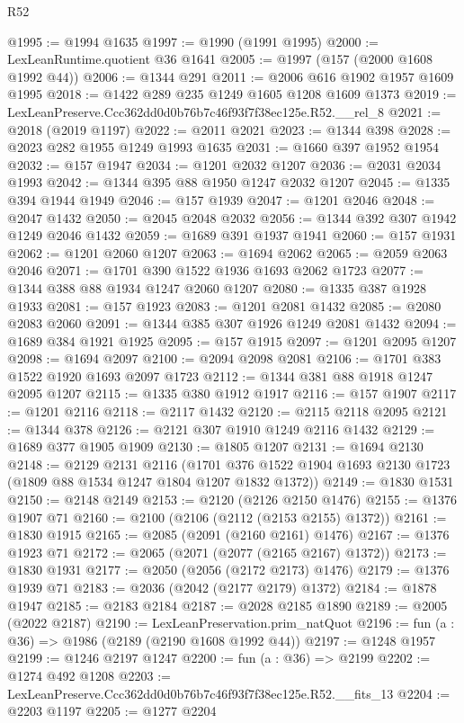 \begin{lexlean}{R52}
\begin{coremodule}
@1995 := @1994 @1635
@1997 := @1990 (@1991 @1995)
@2000 := LexLeanRuntime.quotient @36 @1641
@2005 := @1997 (@157 (@2000 @1608 @1992 @44))
@2006 := @1344 @291
@2011 := @2006 @616 @1902 @1957 @1609 @1995
@2018 := @1422 @289 @235 @1249 @1605 @1208 @1609 @1373
@2019 := LexLeanPreserve.Ccc362dd0d0b76b7c46f93f7f38ec125e.R52.__rel_8
@2021 := @2018 (@2019 @1197)
@2022 := @2011 @2021
@2023 := @1344 @398
@2028 := @2023 @282 @1955 @1249 @1993 @1635
@2031 := @1660 @397 @1952 @1954
@2032 := @157 @1947
@2034 := @1201 @2032 @1207
@2036 := @2031 @2034 @1993
@2042 := @1344 @395 @88 @1950 @1247 @2032 @1207
@2045 := @1335 @394 @1944 @1949
@2046 := @157 @1939
@2047 := @1201 @2046
@2048 := @2047 @1432
@2050 := @2045 @2048 @2032
@2056 := @1344 @392 @307 @1942 @1249 @2046 @1432
@2059 := @1689 @391 @1937 @1941
@2060 := @157 @1931
@2062 := @1201 @2060 @1207
@2063 := @1694 @2062
@2065 := @2059 @2063 @2046
@2071 := @1701 @390 @1522 @1936 @1693 @2062 @1723
@2077 := @1344 @388 @88 @1934 @1247 @2060 @1207
@2080 := @1335 @387 @1928 @1933
@2081 := @157 @1923
@2083 := @1201 @2081 @1432
@2085 := @2080 @2083 @2060
@2091 := @1344 @385 @307 @1926 @1249 @2081 @1432
@2094 := @1689 @384 @1921 @1925
@2095 := @157 @1915
@2097 := @1201 @2095 @1207
@2098 := @1694 @2097
@2100 := @2094 @2098 @2081
@2106 := @1701 @383 @1522 @1920 @1693 @2097 @1723
@2112 := @1344 @381 @88 @1918 @1247 @2095 @1207
@2115 := @1335 @380 @1912 @1917
@2116 := @157 @1907
@2117 := @1201 @2116
@2118 := @2117 @1432
@2120 := @2115 @2118 @2095
@2121 := @1344 @378
@2126 := @2121 @307 @1910 @1249 @2116 @1432
@2129 := @1689 @377 @1905 @1909
@2130 := @1805 @1207
@2131 := @1694 @2130
@2148 := @2129
    @2131
    @2116
    (@1701 @376 @1522 @1904 @1693 @2130 @1723 (@1809 @88 @1534 @1247 @1804 @1207 @1832 @1372))
@2149 := @1830 @1531
@2150 := @2148 @2149
@2153 := @2120 (@2126 @2150 @1476)
@2155 := @1376 @1907 @71
@2160 := @2100 (@2106 (@2112 (@2153 @2155) @1372))
@2161 := @1830 @1915
@2165 := @2085 (@2091 (@2160 @2161) @1476)
@2167 := @1376 @1923 @71
@2172 := @2065 (@2071 (@2077 (@2165 @2167) @1372))
@2173 := @1830 @1931
@2177 := @2050 (@2056 (@2172 @2173) @1476)
@2179 := @1376 @1939 @71
@2183 := @2036 (@2042 (@2177 @2179) @1372)
@2184 := @1878 @1947
@2185 := @2183 @2184
@2187 := @2028 @2185 @1890
@2189 := @2005 (@2022 @2187)
@2190 := LexLeanPreservation.prim_natQuot
@2196 := fun (a : @36) => @1986 (@2189 (@2190 @1608 @1992 @44))
@2197 := @1248 @1957
@2199 := @1246 @2197 @1247
@2200 := fun (a : @36) => @2199
@2202 := @1274 @492 @1208
@2203 := LexLeanPreserve.Ccc362dd0d0b76b7c46f93f7f38ec125e.R52.__fits_13
@2204 := @2203 @1197
@2205 := @1277 @2204

\end{coremodule}
\end{lexlean}
